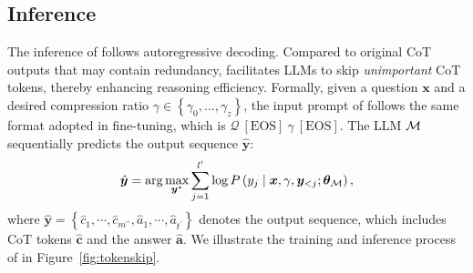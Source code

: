 \subsection{Inference}
\label{sec:inference}
The inference of \method follows autoregressive decoding. Compared to original CoT outputs that may contain redundancy, \method facilitates LLMs to skip \textit{unimportant} CoT tokens, thereby enhancing reasoning efficiency. Formally, given a question $\boldsymbol{x}$ and a desired compression ratio $\gamma \in \left\{\gamma_0,\dots,\gamma_z\right\}$, the input prompt of \method follows the same format adopted in fine-tuning, which is $\mathcal{Q} \ \mathrm{[EOS]} \ \gamma \ \mathrm{[EOS]}$. The LLM $\mathcal{M}$ sequentially predicts the output sequence $\hat{\bm{y}}$:
\begin{equation}
\nonumber
\hat{\boldsymbol{y}}=\arg \max _{\boldsymbol{y}^*} \sum_{j=1}^{l^{\prime}} \log P\left(y_j \mid \boldsymbol{x}, \gamma, \boldsymbol{y}_{<j}; \bm{\theta}_{\mathcal{M}}\right),
\end{equation}
where $\hat{\bm{y}} =\left\{\hat{c}_1, \cdots,\hat{c}_{m^{\prime\prime}}, \hat{a}_1, \cdots, \hat{a}_{t^{\prime}}  \right\}$ denotes the output sequence, which includes CoT tokens $\hat{\bm{c}}$ and the answer $\bm{\hat{a}}$. We illustrate the training and inference process of \method in Figure~\ref{fig:tokenskip}. 
